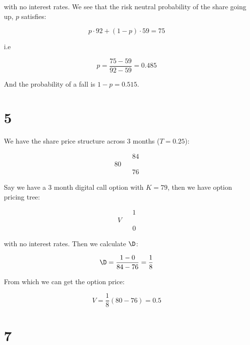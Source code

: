 \documentclass{article}
\begin{document}
	with no interest rates. We see that the risk neutral probability of the share going up, $p$ satisfies:
	
	\begin{equation*}
		p\cdot 92 + (1-p)\cdot59 = 75
	\end{equation*}
	
	i.e
	
	\begin{equation*}
		p = \frac{75 - 59}{92 - 59} = 0.485
	\end{equation*}
	
	And the probability of a fall is $1 - p = 0.515$.
	
	\section*{5}
	
	We have the share price structure across 3 months ($T = 0.25$):
	
	\begin{equation*}
		\begin{array}{ccc}
			   &   & 84 \\
			80 &   & \\
			   &   & 76
		\end{array}
	\end{equation*}
	
	Say we have a 3 month digital call option with $K=79$, then we have option pricing tree:
	
	\begin{equation*}
		\begin{array}{ccc}
			   &   & 1 \\
			V &   & \\
			   &   & 0
		\end{array}
	\end{equation*} 
	
	with no interest rates. Then we calculate $\D$:
	
	\begin{equation*}
		\D = \frac{1 - 0}{84-76} = \frac{1}{8}
	\end{equation*}
	
	From which we can get the option price:
	
	\begin{equation*}
		V = \frac{1}{8} (80 - 76) = 0.5
	\end{equation*}

	\section*{7}
	
\end{document}
